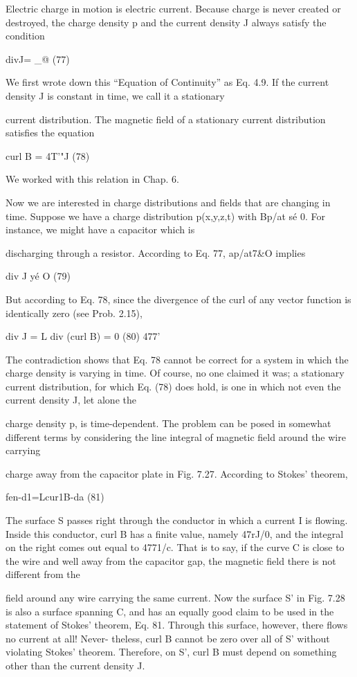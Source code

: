 Electric charge in motion is electric current. Because charge is
never created or destroyed, the charge density p and the current
density J always satisfy the condition

divJ= _@ (77)

We first wrote down this ``Equation of Continuity'' as Eq. 4.9.
If the current density J is constant in time, we call it a stationary

current distribution. The magnetic field of a stationary current distribution
satisfies the equation

curl B = 4T'"J (78)

We worked with this relation in Chap. 6.

Now we are interested in charge distributions and fields that are
changing in time. Suppose we have a charge distribution p(x,y,z,t)
with Bp/at sé 0. For instance, we might have a capacitor which is

discharging through a resistor. According to Eq. 77, ap/at7&O
implies

div J yé O (79)

But according to Eq. 78, since the divergence of the curl of any
vector function is identically zero (see Prob. 2.15),

div J = L div (curl B) = 0 (80)
477'

The contradiction shows that Eq. 78 cannot be correct for a system
in which the charge density is varying in time. Of course, no one
claimed it was; a stationary current distribution, for which Eq. (78)
does hold, is one in which not even the current density J, let alone the

charge density p, is time-dependent.
The problem can be posed in somewhat different terms by considering
the line integral of magnetic field around the wire carrying

charge away from the capacitor plate in Fig. 7.27. According to
Stokes' theorem,

fen-d1=Lcur1B-da (81)

The surface S passes right through the conductor in which a current
I is flowing. Inside this conductor, curl B has a finite value,
namely 47rJ/0, and the integral on the right comes out equal to 4771/c.
That is to say, if the curve C is close to the wire and well away from
the capacitor gap, the magnetic field there is not different from the

field around any wire carrying the same current. Now the surface S'
in Fig. 7.28 is also a surface spanning C, and has an equally good
claim to be used in the statement of Stokes' theorem, Eq. 81.
Through this surface, however, there flows no current at all! Never-
theless, curl B cannot be zero over all of S' without violating Stokes'
theorem. Therefore, on S', curl B must depend on something other
than the current density J.

